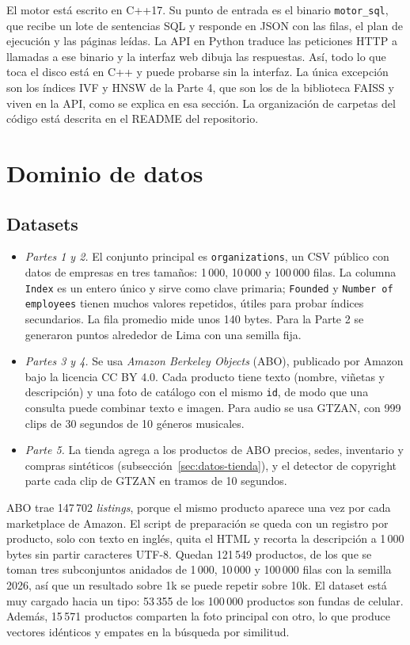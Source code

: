 \documentclass[11pt,a4paper]{article}
\begin{document}
El motor está escrito en C++17. Su punto de entrada es el binario \texttt{motor\_sql}, que recibe un lote de sentencias SQL y responde en JSON con las filas, el plan de ejecución y las páginas leídas. La API en Python traduce las peticiones HTTP a llamadas a ese binario y la interfaz web dibuja las respuestas. Así, todo lo que toca el disco está en C++ y puede probarse sin la interfaz. La única excepción son los índices IVF y HNSW de la Parte 4, que son los de la biblioteca FAISS y viven en la API, como se explica en esa sección. La organización de carpetas del código está descrita en el README del repositorio.

\section{Dominio de datos}

\subsection{Datasets}

\begin{itemize}
  \item \emph{Partes 1 y 2.} El conjunto principal es \texttt{organizations}, un CSV público con datos de empresas en tres tamaños: 1\,000, 10\,000 y 100\,000 filas. La columna \texttt{Index} es un entero único y sirve como clave primaria; \texttt{Founded} y \texttt{Number of employees} tienen muchos valores repetidos, útiles para probar índices secundarios. La fila promedio mide unos 140 bytes. Para la Parte 2 se generaron puntos alrededor de Lima con una semilla fija.
  \item \emph{Partes 3 y 4.} Se usa \emph{Amazon Berkeley Objects} (ABO), publicado por Amazon bajo la licencia CC BY 4.0. Cada producto tiene texto (nombre, viñetas y descripción) y una foto de catálogo con el mismo \texttt{id}, de modo que una consulta puede combinar texto e imagen. Para audio se usa GTZAN, con 999 clips de 30 segundos de 10 géneros musicales.
  \item \emph{Parte 5.} La tienda agrega a los productos de ABO precios, sedes, inventario y compras sintéticos (subsección~\ref{sec:datos-tienda}), y el detector de copyright parte cada clip de GTZAN en tramos de 10 segundos.
\end{itemize}

ABO trae 147\,702 \emph{listings}, porque el mismo producto aparece una vez por cada marketplace de Amazon. El script de preparación se queda con un registro por producto, solo con texto en inglés, quita el HTML y recorta la descripción a 1\,000 bytes sin partir caracteres UTF-8. Quedan 121\,549 productos, de los que se toman tres subconjuntos anidados de 1\,000, 10\,000 y 100\,000 filas con la semilla 2026, así que un resultado sobre 1k se puede repetir sobre 10k. El dataset está muy cargado hacia un tipo: 53\,355 de los 100\,000 productos son fundas de celular. Además, 15\,571 productos comparten la foto principal con otro, lo que produce vectores idénticos y empates en la búsqueda por similitud.
\end{document}

